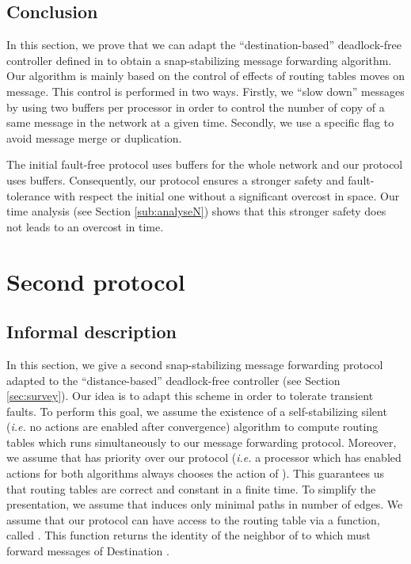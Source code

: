 \documentclass[11pt]{article}
\begin{document}
\subsection{Conclusion}

In this section, we prove that we can adapt the ``destination-based'' deadlock-free controller defined in \cite{MS78} to obtain a snap-stabilizing message forwarding algorithm. Our algorithm is mainly based on the control of effects of routing tables moves on message. This control is performed in two ways. Firstly, we ``slow down'' messages by using two buffers per processor in order to control the number of copy of a same message in the network at a given time. Secondly, we use a specific flag to avoid message merge or duplication.

The initial fault-free protocol uses  buffers for the whole network and our protocol uses  buffers. Consequently, our protocol ensures a stronger safety and fault-tolerance with respect the initial one without a significant overcost in space. Our time analysis (see Section \ref{sub:analyseN}) shows that this stronger safety does not leads to an overcost in time.
 
\section{Second protocol}\label{sec:protocolD}

\subsection{Informal description}

In this section, we give a second snap-stabilizing message forwarding protocol adapted to the ``distance-based'' deadlock-free controller (see Section \ref{sec:survey}). Our idea is to adapt this scheme in order to tolerate transient faults. To perform this goal, we assume the existence of a self-stabilizing silent (\emph{i.e.} no actions are enabled after convergence) algorithm  to compute routing tables which runs simultaneously to our message forwarding protocol. Moreover, we assume that  has priority over our protocol (\emph{i.e.} a processor which has enabled actions for both algorithms always chooses the action of ). This guarantees us that routing tables are correct and constant in a finite time. To simplify the presentation, we assume that  induces only minimal paths in number of edges. We assume that our protocol can have access to the routing table via a function, called . This function returns the identity of the neighbor of  to which  must forward messages of Destination . 
\end{document}
